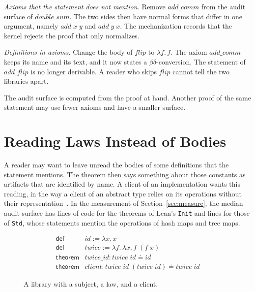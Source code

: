 \documentclass[acmsmall,nonacm,screen]{acmart}
\newcommand{\eqd}{\doteq}
\newcommand{\kw}[1]{\mathsf{#1}}
\newcommand{\nm}[1]{\mathit{#1}}
\newcommand{\lean}[1]{\texttt{#1}}
\begin{document}
\emph{Axioms that the statement does not mention.} Remove $\nm{add\_comm}$ from the audit surface
of $\nm{double\_sum}$. The two sides then have normal forms that differ in one argument, namely
$\nm{add}\;x\;y$ and $\nm{add}\;y\;x$. The mechanization records that the kernel rejects the
proof that only normalizes.

\emph{Definitions in axioms.} Change the body of $\nm{flip}$ to $\lambda f.\,f$. The axiom
$\nm{add\_comm}$ keeps its name and its text, and it now states a $\beta\delta$-conversion. The
statement of $\nm{add\_flip}$ is no longer derivable. A reader who skips $\nm{flip}$ cannot tell
the two libraries apart.

The audit surface is computed from the proof at hand. Another proof of the same statement may use
fewer axioms and have a smaller surface.

\section{Reading Laws Instead of Bodies}
\label{sec:iface}

A reader may want to leave unread the bodies of some definitions that the statement mentions.
The theorem then says something about those constants as artifacts that are identified by name.
A client of an implementation wants this reading, in the way a client of an abstract type relies
on its operations without their representation~\citep{mitchell1988}. In the measurement of
Section~\ref{sec:measure}, the median audit surface has \InitAuditLinesMedian{} lines of code for
the theorems of Lean's \lean{Init} and \StdAuditLinesMedian{} lines for those of \lean{Std},
whose statements mention the operations of hash maps and tree maps.

\begin{figure}
\[
\begin{array}{ll}
\kw{def} & \nm{id} := \lambda x.\,x \\
\kw{def} & \nm{twice} := \lambda f.\,\lambda x.\,f\;(f\;x) \\
\kw{theorem} & \nm{twice\_id} : \nm{twice}\;\nm{id} \eqd \nm{id} \\
\kw{theorem} & \nm{client} : \nm{twice}\;\nm{id}\;(\nm{twice}\;\nm{id}) \eqd \nm{twice}\;\nm{id}
\end{array}
\]
\caption{A library with a subject, a law, and a client.}
\label{fig:laws}
\end{figure}
\end{document}
